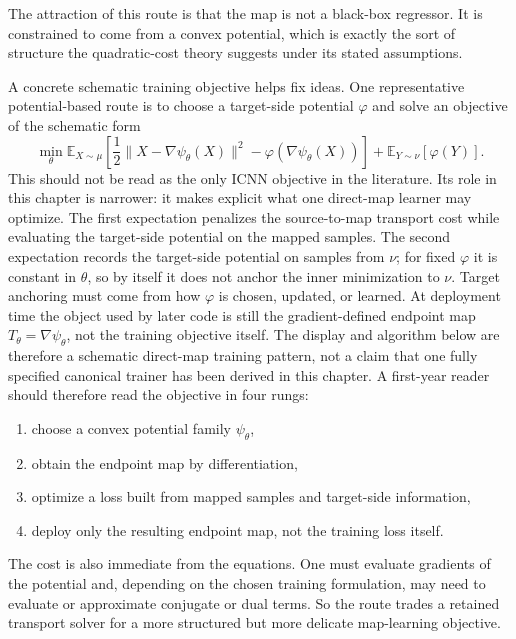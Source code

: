The attraction of this route is that the map is not a black-box regressor.  It
is constrained to come from a convex potential, which is exactly the sort of
structure the quadratic-cost theory suggests under its stated assumptions.

A concrete schematic training objective helps fix ideas.  One representative
potential-based route is to choose a target-side potential \(\varphi\) and solve
an objective of the schematic form
\begin{equation}
\label{eq:bf-neural-ot-direct-icnn-objective}
  \min_\theta
  \mathbb E_{X\sim\mu}\!
  \left[
    \frac{1}{2}\|X-\nabla\psi_\theta(X)\|^2
    - \varphi(\nabla\psi_\theta(X))
  \right]
  +
  \mathbb E_{Y\sim\nu}[\varphi(Y)].
\end{equation}
This should not be read as the only ICNN objective in the literature.  Its role in
this chapter is narrower: it makes explicit what one direct-map learner may
optimize.  The
first expectation penalizes the source-to-map transport cost while evaluating the
target-side potential on the mapped samples.  The second expectation records the target-side potential on samples from
\(\nu\); for fixed \(\varphi\) it is constant in \(\theta\), so by itself it
does not anchor the inner minimization to \(\nu\).  Target anchoring must come
from how \(\varphi\) is chosen, updated, or learned.  At deployment time the object
used by later code is still the gradient-defined endpoint map
\(T_\theta=\nabla\psi_\theta\), not the training objective itself.  The display and
algorithm below are therefore a schematic direct-map training pattern, not a
claim that one fully specified canonical trainer has been derived in this
chapter.  A first-year reader should therefore read the objective in four rungs:
\begin{enumerate}[label=(\roman*)]
  \item choose a convex potential family \(\psi_\theta\),
  \item obtain the endpoint map by differentiation,
  \item optimize a loss built from mapped samples and target-side information,
  \item deploy only the resulting endpoint map, not the training loss itself.
\end{enumerate}

The cost is also immediate from the equations.  One must evaluate gradients of
the potential and, depending on the chosen training formulation, may need to
evaluate or approximate conjugate or dual terms.  So the route trades a
retained transport solver for a more structured but more delicate
map-learning objective.

